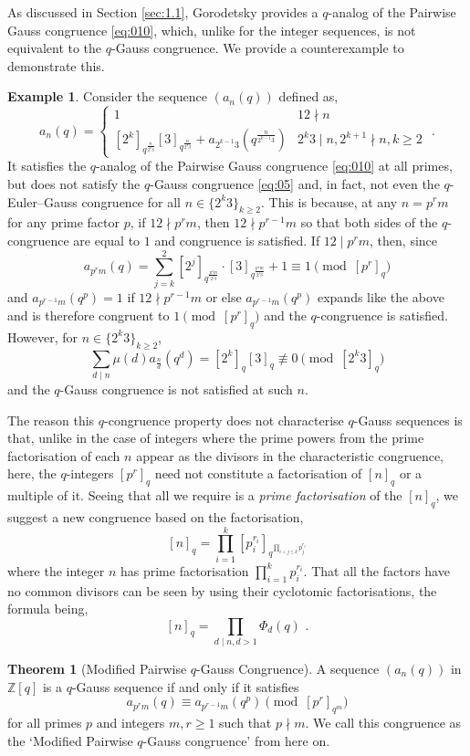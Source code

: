 \documentclass{article}
\numberwithin{equation}{section}
\theoremstyle{definition}
\newtheorem{example}[definition]{\bf {Example}}
\newtheorem{theorem}[definition]{\bf {Theorem}}
\begin{document}
As discussed in Section \ref{sec:1.1}, Gorodetsky provides a $q$-analog of the Pairwise Gauss congruence \eqref{eq:010}, which, unlike for the integer sequences, is not equivalent to the $q$-Gauss congruence. We provide a counterexample to demonstrate this.
\begin{example}
    Consider the sequence $(a_n(q))$ defined as, 
\[
    a_n(q)=
    \begin{cases}
        1&12\nmid n\\
        [2^k]_{q^\frac{n}{2^k3}}[3]_{q^\frac{n}{2^k3}}+a_{2^{k-1}3}\left(q^\frac{n}{2^{k-1}3}\right)&2^k3\mid n, 2^{k+1}\nmid n, k\geq2
    \end{cases}
\text{ .}\]
It satisfies the $q$-analog of the Pairwise Gauss congruence \eqref{eq:010} at all primes, but does not satisfy the $q$-Gauss congruence \eqref{eq:05} and, in fact, not even the $q$-Euler--Gauss congruence for all $n\in\{2^k3\}_{k\geq2}$. This is because, at any $n=p^rm$ for any prime factor $p$, if $12\nmid p^rm$, then $12\nmid p^{r-1}m$ so that both sides of the $q$-congruence are equal to $1$ and congruence is satisfied. If $12\mid p^rm$, then, since
\[a_{p^rm}(q)=\sum_{j=k}^2[2^j]_{q^\frac{p^rm}{2^j3}}\cdot[3]_{q^\frac{p^rm}{2^j3}}+1\equiv1\pmod{[p^r]_q}\]
and $a_{p^{r-1}m}(q^p)=1$ if $12\nmid p^{r-1}m$ or else $a_{p^{r-1}m}(q^p)$ expands like the above and is therefore congruent to $1 \pmod{[p^r]_q}$ and the $q$-congruence is satisfied. However, for $n\in\{2^k3\}_{k\geq2}$, 
\[\sum_{d\mid n}\mu(d)a_\frac{n}{d}(q^d)=[2^k]_q[3]_q\not\equiv0\pmod{[2^k3]_q}\]
and the $q$-Gauss congruence is not satisfied at such $n$.
\end{example}



The reason this $q$-congruence property does not characterise $q$-Gauss sequences is that, unlike in the case of integers where the prime powers from the prime factorisation of each $n$ appear as the divisors in the characteristic congruence, here, the $q$-integers $[p^r]_q$ need not constitute a factorisation of $[n]_q$ or a multiple of it. Seeing that all we require is a \textit{prime factorisation} of the $[n]_q$, we suggest a new congruence based on the factorisation,
\begin{equation}\label{eq:016}[n]_q=\prod_{i=1}^k[p_i^{r_i}]_{q^{\prod_{i<j\leq k}p_j^{r_j}}}
\end{equation}
where the integer $n$ has prime factorisation $\prod_{i=1}^kp_i^{r_i}$. That all the factors have no common divisors can be seen by using their cyclotomic factorisations, the formula being, 
\[[n]_q=\prod_{d\mid n,d>1}\Phi_d(q)\text{ .}\]
\begin{theorem}[Modified Pairwise $q$-Gauss Congruence]
    A sequence $(a_n(q))$ in $\mathbb{Z}[q]$ is a $q$-Gauss sequence if and only if it satisfies 
    \begin{equation}\label{eq:15}
        a_{p^rm}(q)\equiv a_{p^{r-1}m}(q^p)\pmod{[p^r]_{q^m}}
    \end{equation}
    for all primes $p$ and integers $m,r\geq1$ such that $p\nmid m$. We call this congruence as the `Modified Pairwise $q$-Gauss congruence' from here on.
\end{theorem}
\end{document}
